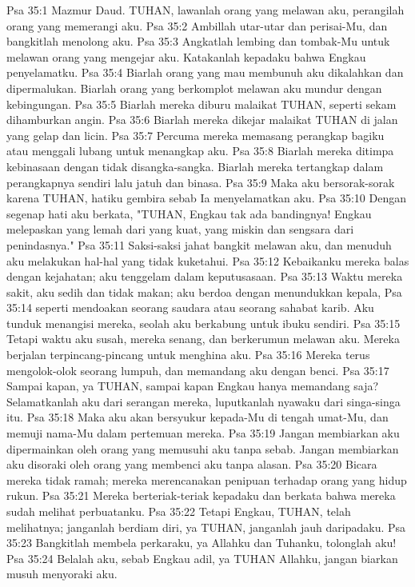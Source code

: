 Psa 35:1  Mazmur Daud. TUHAN, lawanlah orang yang melawan aku, perangilah orang yang memerangi aku.
Psa 35:2  Ambillah utar-utar dan perisai-Mu, dan bangkitlah menolong aku.
Psa 35:3  Angkatlah lembing dan tombak-Mu untuk melawan orang yang mengejar aku. Katakanlah kepadaku bahwa Engkau penyelamatku.
Psa 35:4  Biarlah orang yang mau membunuh aku dikalahkan dan dipermalukan. Biarlah orang yang berkomplot melawan aku mundur dengan kebingungan.
Psa 35:5  Biarlah mereka diburu malaikat TUHAN, seperti sekam dihamburkan angin.
Psa 35:6  Biarlah mereka dikejar malaikat TUHAN di jalan yang gelap dan licin.
Psa 35:7  Percuma mereka memasang perangkap bagiku atau menggali lubang untuk menangkap aku.
Psa 35:8  Biarlah mereka ditimpa kebinasaan dengan tidak disangka-sangka. Biarlah mereka tertangkap dalam perangkapnya sendiri lalu jatuh dan binasa.
Psa 35:9  Maka aku bersorak-sorak karena TUHAN, hatiku gembira sebab Ia menyelamatkan aku.
Psa 35:10  Dengan segenap hati aku berkata, "TUHAN, Engkau tak ada bandingnya! Engkau melepaskan yang lemah dari yang kuat, yang miskin dan sengsara dari penindasnya."
Psa 35:11  Saksi-saksi jahat bangkit melawan aku, dan menuduh aku melakukan hal-hal yang tidak kuketahui.
Psa 35:12  Kebaikanku mereka balas dengan kejahatan; aku tenggelam dalam keputusasaan.
Psa 35:13  Waktu mereka sakit, aku sedih dan tidak makan; aku berdoa dengan menundukkan kepala,
Psa 35:14  seperti mendoakan seorang saudara atau seorang sahabat karib. Aku tunduk menangisi mereka, seolah aku berkabung untuk ibuku sendiri.
Psa 35:15  Tetapi waktu aku susah, mereka senang, dan berkerumun melawan aku. Mereka berjalan terpincang-pincang untuk menghina aku.
Psa 35:16  Mereka terus mengolok-olok seorang lumpuh, dan memandang aku dengan benci.
Psa 35:17  Sampai kapan, ya TUHAN, sampai kapan Engkau hanya memandang saja? Selamatkanlah aku dari serangan mereka, luputkanlah nyawaku dari singa-singa itu.
Psa 35:18  Maka aku akan bersyukur kepada-Mu di tengah umat-Mu, dan memuji nama-Mu dalam pertemuan mereka.
Psa 35:19  Jangan membiarkan aku dipermainkan oleh orang yang memusuhi aku tanpa sebab. Jangan membiarkan aku disoraki oleh orang yang membenci aku tanpa alasan.
Psa 35:20  Bicara mereka tidak ramah; mereka merencanakan penipuan terhadap orang yang hidup rukun.
Psa 35:21  Mereka berteriak-teriak kepadaku dan berkata bahwa mereka sudah melihat perbuatanku.
Psa 35:22  Tetapi Engkau, TUHAN, telah melihatnya; janganlah berdiam diri, ya TUHAN, janganlah jauh daripadaku.
Psa 35:23  Bangkitlah membela perkaraku, ya Allahku dan Tuhanku, tolonglah aku!
Psa 35:24  Belalah aku, sebab Engkau adil, ya TUHAN Allahku, jangan biarkan musuh menyoraki aku.
